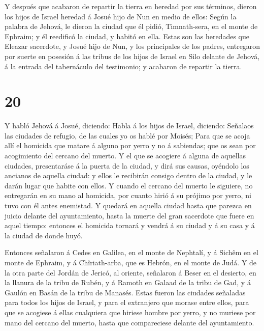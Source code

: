 Y después que acabaron de repartir la tierra en heredad
por sus términos, dieron los hijos de Israel heredad á Josué hijo de Nun
en medio de ellos:  Según la palabra de Jehová, le dieron
la ciudad que él pidió, Timnath-sera, en el monte de Ephraim; y él
reedificó la ciudad, y habitó en ella.  Estas son las
heredades que Eleazar sacerdote, y Josué hijo de Nun, y los principales
de los padres, entregaron por suerte en posesión á las tribus de los
hijos de Israel en Silo delante de Jehová, á la entrada del tabernáculo
del testimonio; y acabaron de repartir la tierra.

\hypertarget{section-19}{%
\section{20}\label{section-19}}

 Y habló Jehová á Josué, diciendo:  Habla á los
hijos de Israel, diciendo: Señalaos las ciudades de refugio, de las
cuales yo os hablé por Moisés;  Para que se acoja allí el
homicida que matare á alguno por yerro y no á sabiendas; que os sean por
acogimiento del cercano del muerto.  Y el que se acogiere á
alguna de aquellas ciudades, presentaráse á la puerta de la ciudad, y
dirá sus causas, oyéndolo los ancianos de aquella ciudad: y ellos le
recibirán consigo dentro de la ciudad, y le darán lugar que habite con
ellos.  Y cuando el cercano del muerto le siguiere, no
entregarán en su mano al homicida, por cuanto hirió á su prójimo por
yerro, ni tuvo con él antes enemistad.  Y quedará en aquella
ciudad hasta que parezca en juicio delante del ayuntamiento, hasta la
muerte del gran sacerdote que fuere en aquel tiempo: entonces el
homicida tornará y vendrá á su ciudad y á su casa y á la ciudad de donde
huyó.

 Entonces señalaron á Cedes en Galilea, en el monte de
Nephtalí, y á Sichêm en el monte de Ephraim, y á Chîriath-arba, que es
Hebrón, en el monte de Judá.  Y de la otra parte del Jordán
de Jericó, al oriente, señalaron á Beser en el desierto, en la llanura
de la tribu de Rubén, y á Ramoth en Galaad de la tribu de Gad, y á
Gaulón en Basán de la tribu de Manasés.  Estas fueron las
ciudades señaladas para todos los hijos de Israel, y para el extranjero
que morase entre ellos, para que se acogiese á ellas cualquiera que
hiriese hombre por yerro, y no muriese por mano del cercano del muerto,
hasta que compareciese delante del ayuntamiento.

